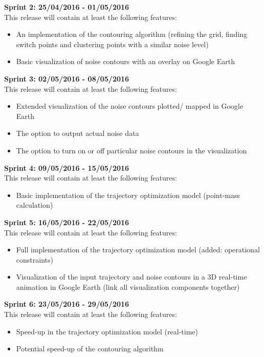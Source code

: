 \documentclass[a4paper,english,fleqn]{exam}
\begin{document}
\textbf{Sprint 2: 25/04/2016 - 01/05/2016 } \\
This release will contain at least the following features:
\begin{itemize}
\item An implementation of the contouring algorithm (refining the grid, finding switch points and clustering points with a similar noise level)
\item Basic visualization of noise contours with an overlay on Google Earth
\end{itemize}

\textbf{Sprint 3: 02/05/2016 - 08/05/2016} \\
This release will contain at least the following features:
\begin{itemize}
\item Extended visualization of the noise contours plotted/ mapped in Google Earth
\item The option to output actual noise data
\item The option to turn on or off particular noise contours in the visualization
\end{itemize}

\textbf{Sprint 4: 09/05/2016 - 15/05/2016} \\
This release will contain at least the following features:
\begin{itemize}
\item Basic implementation of the trajectory optimization model (point-mass calculation)
\end{itemize}

\textbf{Sprint 5: 16/05/2016 - 22/05/2016} \\
This release will contain at least the following features:
\begin{itemize}
\item Full implementation of the trajectory optimization model (added: operational constraints)
\item Visualization of the input trajectory and noise contours in a 3D real-time animation in Google Earth (link all visualization components together)
\end{itemize}

\textbf{Sprint 6: 23/05/2016 - 29/05/2016} \\
This release will contain at least the following features:
\begin{itemize}
\item Speed-up in the trajectory optimization model (real-time)
\item Potential speed-up of the contouring algorithm
\end{itemize}
\end{document}
